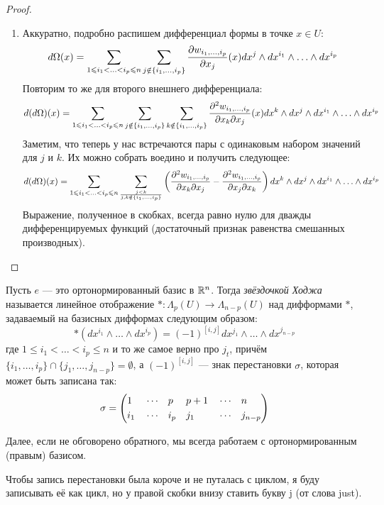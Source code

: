 \begin{proof}
\begin{enumerate}
		\item Аккуратно, подробно распишем дифференциал формы в точке $x \in U$:
		\[
			d\Omega(x) = \sum_{1 \leqslant i_1 < \ldots < i_p \leqslant n} \sum_{j \notin \{i_1, \ldots, i_p\}} \frac{\partial w_{i_1, \ldots, i_p}}{\partial x_j}(x) dx^j \wedge dx^{i_1} \wedge \ldots \wedge dx^{i_p}
		\]
		Повторим то же для второго внешнего дифференциала:
		\[
			d(d\Omega)(x) = \sum_{1 \leqslant i_1 < \ldots < i_p \leqslant n} \sum_{j \notin \{i_1, \ldots, i_p\}} \sum_{k \notin \{i_1, \ldots, i_p\}} \frac{\partial ^2 w_{i_1, \ldots, i_p}}{\partial x_k \partial x_j}(x) dx^k \wedge dx^j \wedge dx^{i_1} \wedge \ldots \wedge dx^{i_p}
		\]
		Заметим, что теперь у нас встречаются пары с одинаковым набором значений для $j$ и $k$. Их можно собрать воедино и получить следующее:
		\[
			d(d\Omega)(x) = \sum_{1 \leqslant i_1 < \ldots < i_p \leqslant n} \sum_{j < k \over {j, k \notin \{i_1, \ldots, i_p\}}} \left(\frac{\partial ^2 w_{i_1, \ldots, i_p}}{\partial x_k \partial x_j} - \frac{\partial ^2 w_{i_1, \ldots, i_p}}{\partial x_j \partial x_k}\right) dx^k \wedge dx^j \wedge dx^{i_1} \wedge \ldots \wedge dx^{i_p}
		\]
		Выражение, полученное в скобках, всегда равно нулю для дважды дифференцируемых функций (достаточный признак равенства смешанных производных).
	\end{enumerate}
\end{proof}

\begin{definition}
	Пусть $e$ --- это ортонормированный базис в $\mathbb{R}^n$. Тогда \textit{звёздочкой Ходжа} называется линейное отображение $* \colon \Lambda_p(U) \to \Lambda_{n - p}(U)$ над дифформами $*$, задаваемый на базисных дифформах следующим образом:
	\[
		*(dx^{i_1} \wedge \ldots \wedge dx^{i_p}) = (-1)^{[i, j]} dx^{j_1} \wedge \ldots \wedge dx^{j_{n - p}}
	\]
	где $1 \le i_1 < \ldots < i_p \le n$ и то же самое верно про $j_t$, причём $\{i_1, \ldots, i_p\} \cap \{j_1, \ldots, j_{n - p}\} = \emptyset$, а $(-1)^{[i, j]}$ --- знак перестановки $\sigma$, которая может быть записана так:
	\[
		\sigma = \left( \begin{aligned} 
			&1& &\cdots& &p& &p + 1& &\cdots& &n
			\\
			&i_1& &\cdots& &i_p& &j_1& &\cdots& &j_{n - p}
		 \end{aligned} \right)
	\]
\end{definition}

\begin{note}
	Далее, если не обговорено обратного, мы всегда работаем с ортонормированным (правым) базисом.
\end{note}

\begin{anote}
	Чтобы запись перестановки была короче и не путалась с циклом, я буду записывать её как цикл, но у правой скобки внизу ставить букву j (от слова just).
\end{anote}


